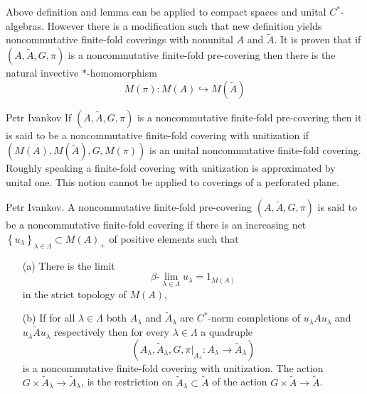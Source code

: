 \documentclass{beamer}
\theoremstyle{plain}
\newcommand{\hookto}{\hookrightarrow}        %
\begin{document}
\begin{frame}
	
	Above definition and lemma can be applied to compact spaces and unital $C^*$-algebras. However there is a modification such that new definition yields noncommutative finite-fold coverings with nonunital $A$ and $\widetilde{A}$. It is proven that if $\left(A, \widetilde{A}, G, \pi \right)$ is a noncommutative finite-fold  pre-covering  then there is the natural invective $*$-homomorphism
	$$
	M\left( \pi\right): M\left( A\right)  \hookto M\left(\widetilde A \right) 
	$$
	
	\begin{definition}\label{fin_comp_defn}\alert{Petr  Ivankov}
		If $\left(A, \widetilde{A}, G, \pi \right)$ is a noncommutative finite-fold  pre-covering then it is said to be 	a \alert{noncommutative finite-fold covering with unitization} if 
		$\left(	M\left( A\right) , 	M\left( \widetilde{A}\right) , G, 	M\left( \pi\right)  \right)$ is an unital {noncommutative finite-fold covering}.
		Roughly speaking a finite-fold covering with unitization is approximated by unital one. This notion cannot be applied to coverings of a perforated plane.
		
			\end{definition}
\end{frame}
\begin{frame}
	\begin{definition}
		\alert{Petr Ivankov}.	A   noncommutative finite-fold  pre-covering $\left(A, \widetilde{A}, G, \pi \right)$ is said to be  a \alert{noncommutative finite-fold covering} if there is an increasing net $\left\{u_\lambda\right\}_{\lambda\in\Lambda}\subset M\left( A\right)_+ $  of positive elements such that
		\begin{enumerate}
			\item[(a)] There is the limit 
			$$
			\beta\text{-}\lim_{\lambda \in \Lambda} u_\lambda = 1_{M\left(A \right) }
			$$
			in the strict topology of $M\left(A \right)$,
			\item[(b)]  If for all   $\lambda\in\Lambda$ both $A_\lambda$ and  $\widetilde A_\lambda$ are $C^*$-norm completions  of $u_\lambda A u_\lambda$ and  $u_\lambda\widetilde{A}u_\lambda$ respectively then for every $\lambda\in\Lambda$ a quadruple
			$$
			\left(A_\lambda, \widetilde{A}_\lambda, G, \left.\pi\right|_{A_\lambda} :A_\lambda\to \widetilde{A}_\lambda\right)	
			$$
			is a noncommutative finite-fold covering with unitization. The action 	$G \times \widetilde{A}_\lambda\to \widetilde{A}_\lambda$, is the restriction on $\widetilde{A}_\lambda\subset \widetilde{   A}$ of the action $G\times  \widetilde{A}\to \widetilde{A}$.
		\end{enumerate}
	\end{definition}
\end{frame}
\end{document}
